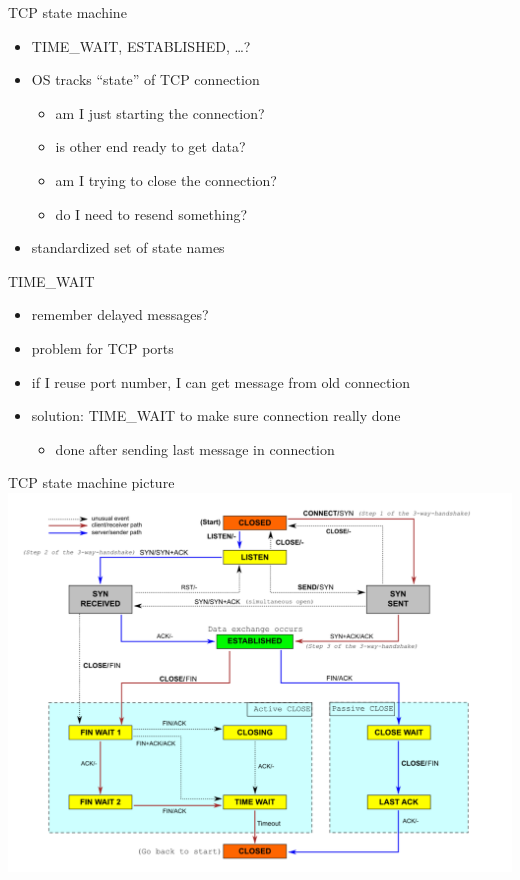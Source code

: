 \begin{frame}{TCP state machine}
\begin{itemize}
\item TIME\_WAIT, ESTABLISHED, \ldots?
\vspace{.5cm}
\item OS tracks ``state'' of TCP connection
    \begin{itemize}
    \item am I just starting the connection?
    \item is other end ready to get data?
    \item am I trying to close the connection?
    \item do I need to resend something?
    \end{itemize}
\item standardized set of state names
\end{itemize}
\end{frame}


\begin{frame}{TIME\_WAIT}
\begin{itemize}
\item remember delayed messages?
\vspace{.5cm}
\item problem for TCP ports
\item if I reuse port number, I can get message from old connection
\item solution: TIME\_WAIT to make sure connection really done
    \begin{itemize}
    \item done after sending last message in connection
    \end{itemize}
\end{itemize}
\end{frame}

\begin{frame}{TCP state machine picture}
\includegraphics[height=0.9\textheight]{TcpState}
\end{frame}
